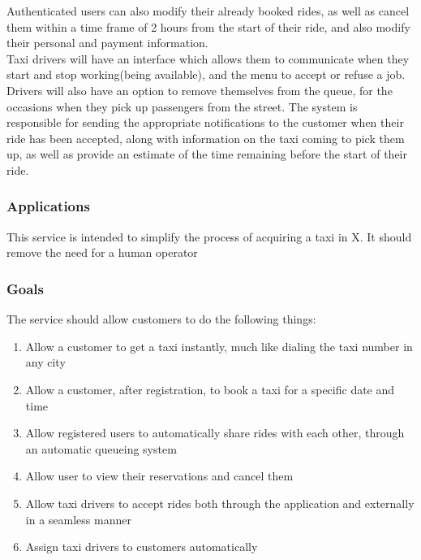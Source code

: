 		
		\newpage
		Authenticated users can also modify their already booked rides, as well as cancel them within a time frame of 2 hours from the start of their ride, and also modify
		their personal and payment information.\\
		Taxi drivers will have an interface which allows them to communicate when they start and stop working(being available), and the menu to accept or refuse a 
		job. Drivers will also have an option to remove themselves from the queue, for the occasions when they pick up passengers from the street.
		The system is responsible for sending the appropriate notifications to the customer when their ride has been accepted, along with information
		on the taxi coming to pick them up,	as well as provide an estimate of the time remaining before the start of their ride.
	\subsubsection{Applications}
		This service is intended to simplify the process of acquiring a taxi in X. It should remove the need for a human operator
	\subsubsection{Goals}
		The service should allow customers to do the following things:
		\begin{enumerate}
		\item Allow a customer to get a taxi instantly, much like dialing the taxi number in any city
		\item Allow a customer, after registration, to book a taxi for a specific date and time
		\item Allow registered users to automatically share rides with each other, through an automatic queueing system
		\item Allow user to view their reservations and cancel them
		\item Allow taxi drivers to accept rides both through the application and externally in a seamless manner
		\item Assign taxi drivers to customers automatically 
		\end{enumerate}
			
\newpage
